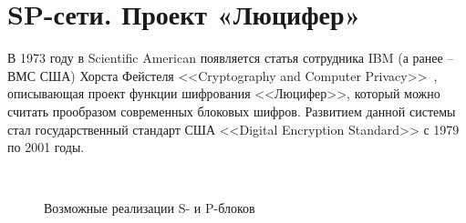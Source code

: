 \section{SP-сети. Проект «Люцифер»}\label{section-project-lucifer}

В 1973 году в Scientific American появляется статья сотрудника IBM (а ранее -- ВМС США) Хорста Фейстеля <<Cryptography and Computer Privacy>>~\cite{Feistel:1973}, описывающая проект функции шифрования <<Люцифер>>, который можно считать прообразом современных блоковых шифров. Развитием данной системы стал государственный стандарт США <<Digital Encryption Standard>> с 1979 по 2001 годы.

\begin{figure}[!t]
    \centering
    ~~~
		\caption{Возможные реализации S- и P-блоков}
\end{figure}

